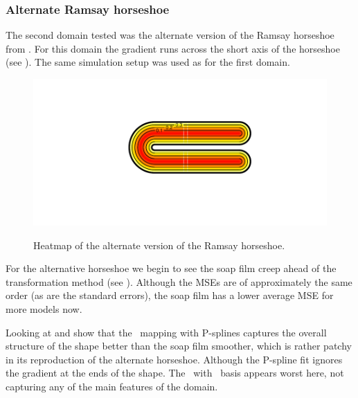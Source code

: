 \subsubsection{Alternate Ramsay horseshoe}

The second domain tested was the alternate version of the Ramsay horseshoe from \cite{soap}. For this domain the gradient runs across the short axis of the horseshoe (see ). The same simulation setup was used as for the first domain.

\begin{figure}
\centering
\includegraphics[trim=0.5in 1in 0in 0.5in]{sc/figs/altramsayhorseshoe.pdf} \\
\caption{Heatmap of the alternate version of the Ramsay horseshoe.}
\label{altramsayhorseshoe}
\end{figure}

For the alternative horseshoe we begin to see the soap film creep ahead of the transformation method (see ). Although the MSEs are of approximately the same order (as are the standard errors), the soap film has a lower average MSE for more models now. 

Looking at  and show that the \sch\ mapping with P-splines captures the overall structure of the shape better than the soap film smoother, which is rather patchy in its reproduction of the alternate horseshoe. Although the P-spline fit ignores the gradient at the ends of the shape. The \sch\ with \tprs\ basis appears worst here, not capturing any of the main features of the domain.

